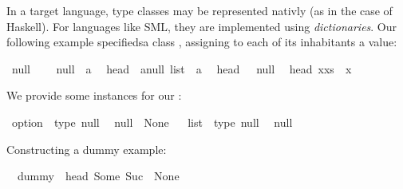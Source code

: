 \begin{isabellebody}
\begin{isamarkuptext}
  In a target language, type classes may be represented
  nativly (as in the case of Haskell). For languages
  like SML, they are implemented using \emph{dictionaries}.
  Our following example specifiedsa class ,
  assigning to each of its inhabitants a  value:%
\end{isamarkuptext}%
\isamarkuptrue%
\isamarkupfalse%
\ null\ {\isacharequal}\isanewline
\ \ \ null\ {\isacharcolon}{\isacharcolon}\ {\isacharprime}a\isanewline
\isanewline
{}\isamarkupfalse%
\isanewline
\ \ head\ {\isacharcolon}{\isacharcolon}\ {\isachardoublequoteopen}{\isacharprime}a{\isasymColon}null\ list\ {\isasymRightarrow}\ {\isacharprime}a{\isachardoublequoteclose}\isanewline
\isanewline
{}\isamarkupfalse%
\isanewline
\ \ {\isachardoublequoteopen}head\ {\isacharbrackleft}{\isacharbrackright}\ {\isacharequal}\ null{\isachardoublequoteclose}\isanewline
\ \ {\isachardoublequoteopen}head\ {\isacharparenleft}x{\isacharhash}xs{\isacharparenright}\ {\isacharequal}\ x{\isachardoublequoteclose}%
\begin{isamarkuptext}%
We provide some instances for our :%
\end{isamarkuptext}%
\isamarkuptrue%
\isamarkupfalse%
\ option\ {\isacharcolon}{\isacharcolon}\ {\isacharparenleft}type{\isacharparenright}\ null\isanewline
\ \ {\isachardoublequoteopen}null\ {\isasymequiv}\ None{\isachardoublequoteclose}%
\isadelimproof
\ %
\endisadelimproof
%
\isatagproof
\isacommand{{\isachardot}{\isachardot}}\isamarkupfalse%
%
\endisatagproof
{\isafoldproof}%
%
\isadelimproof
%
\endisadelimproof
\isanewline
\isanewline
{}\isamarkupfalse%
\ list\ {\isacharcolon}{\isacharcolon}\ {\isacharparenleft}type{\isacharparenright}\ null\isanewline
\ \ {\isachardoublequoteopen}null\ {\isasymequiv}\ {\isacharbrackleft}{\isacharbrackright}{\isachardoublequoteclose}%
\isadelimproof
\ %
\endisadelimproof
%
\isatagproof
\isacommand{{\isachardot}{\isachardot}}\isamarkupfalse%
%
\endisatagproof
{\isafoldproof}%
%
\isadelimproof
%
\endisadelimproof
%
\begin{isamarkuptext}%
Constructing a dummy example:%
\end{isamarkuptext}%
\isamarkuptrue%
\isamarkupfalse%
\isanewline
\ \ {\isachardoublequoteopen}dummy\ {\isacharequal}\ head\ {\isacharbrackleft}Some\ {\isacharparenleft}Suc\ {}{\isacharparenright}{\isacharcomma}\ None{\isacharbrackright}{\isachardoublequoteclose}%
\begin{isamarkuptext}%

\end{isamarkuptext}
\end{isabellebody}
